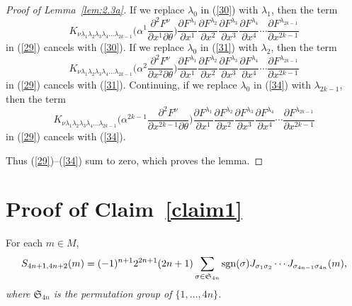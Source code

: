 \documentclass[pdftex]{sigma}
\numberwithin{equation}{section}
\theoremstyle{definition}
\newcommand{\sgn}{{\rm sgn}}
\begin{document}
\begin{proof}[Proof of Lemma~\ref{lem:2.3a}]
If we replace $\lambda_0$ in (\ref{30}) with $\lambda_1$, then the term
\[K_{\nu\lambda_1\lambda_2\lambda_3\lambda_4\dots\lambda_{2k-1}}\biggl(\alpha^1 \frac{\partial^2F^\nu}{\partial x^1\partial\theta}\biggr)\frac{\partial F^{\lambda_1}}{\partial x^1}\frac{\partial F^{\lambda_2}}{\partial x^2}
\frac{\partial F^{\lambda_3}}{\partial x^3}\frac{\partial F^{\lambda_4}}{\partial x^4}\cdots
\frac{\partial F^{\lambda_{2k-1}}}{\partial x^{2k-1}}\]
in (\ref{29}) cancels with (\ref{30}).
If we replace $\lambda_0$ in (\ref{31}) with $\lambda_2$, then the term
\[K_{\nu\lambda_1\lambda_2\lambda_3\lambda_4\dots\lambda_{2k-1}}\biggl(\alpha^2 \frac{\partial^2F^\nu}{\partial x^2\partial\theta}\biggr)\frac{\partial F^{\lambda_1}}{\partial x^1}\frac{\partial F^{\lambda_2}}{\partial x^2}
\frac{\partial F^{\lambda_3}}{\partial x^3}\frac{\partial F^{\lambda_4}}{\partial x^4}\cdots
\frac{\partial F^{\lambda_{2k-1}}}{\partial x^{2k-1}}\]
in (\ref{29}) cancels with (\ref{31}).
Continuing, if we replace $\lambda_0$ in (\ref{34}) with $\lambda_{2k-1}$, then the term
\[K_{\nu\lambda_1\lambda_2\lambda_3\lambda_4\dots\lambda_{2k-1}}\biggl(\alpha^{2k-1} \frac{\partial^2F^\nu}{\partial x^{2k-1}\partial\theta}\biggr)\frac{\partial F^{\lambda_1}}{\partial x^1}\frac{\partial F^{\lambda_2}}{\partial x^2}
\frac{\partial F^{\lambda_3}}{\partial x^3}\frac{\partial F^{\lambda_4}}{\partial x^4}\cdots
\frac{\partial F^{\lambda_{2k-1}}}{\partial x^{2k-1}}\]
in (\ref{29}) cancels with (\ref{34}).

Thus (\ref{29})--(\ref{34}) sum to zero, which proves the lemma.
\end{proof}

\section{Proof of Claim~\ref{claim1}}\label{app:claim}

 For each $m\in M$,
\begin{equation}\label{Seqn1}
S_{4n+1,4n+2}(m) =
(-1)^{n+1} 2^{2n+1}(2n+1)
\sum_{\sigma \in \mathfrak S_{4n}} \sgn(\sigma) J_{\sigma_1 \sigma_2} \cdots J_{\sigma_{4n-1} \sigma_{4n}}(m),
\end{equation}
{\it where $\mathfrak S_{4n}$ is the permutation group of $\{1,\dots, 4n\}$.}
\end{document}
